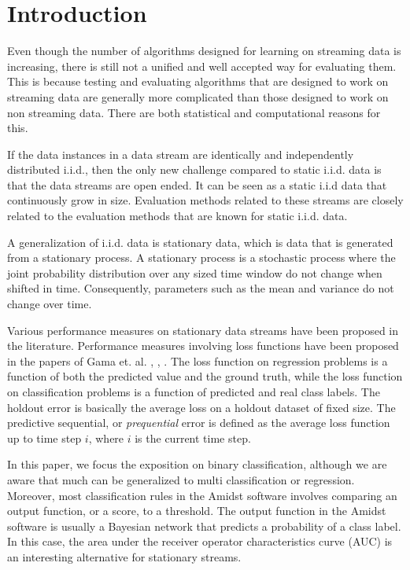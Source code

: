 \section{Introduction}

Even though the number of algorithms designed for learning on streaming data is increasing, there is still not a unified and well accepted way for evaluating them.  This is because testing and evaluating algorithms that are designed to work on streaming data are generally more complicated than those designed to work on non streaming data.  There are both statistical and computational reasons for this.  

If the data instances in a data stream are identically and independently distributed i.i.d., then the only new challenge compared to static i.i.d. data is that the data streams are open ended.  It can be seen as a static i.i.d data that continuously grow in size.  Evaluation methods related to these streams are closely related to the evaluation methods that are known for static i.i.d. data.  

A generalization of i.i.d. data is stationary data, which is data that is generated from a stationary process. A stationary process is a stochastic process where the joint probability distribution over any sized time window do not change when shifted in time.  Consequently, parameters such as the mean and variance do not change over time.

Various performance measures on stationary data streams have been proposed in the literature.  Performance measures involving loss functions have been proposed in the papers of Gama et. al. \cite{Gam09}, \cite{Gam09_2}, \cite{Gam13}.  The loss function on regression problems is a function of both the predicted value and the ground truth, while the loss function on classification problems is a function of predicted and real class labels.  The holdout error is basically the average loss on a holdout dataset of fixed size.  The predictive sequential, or \emph{prequential} error is defined as the average loss function up to time step $i$, where $i$ is the current time step. 

In this paper, we focus the exposition on binary classification, although we are aware that much can be generalized to multi classification or regression.  Moreover, most classification rules in the Amidst software involves comparing an output function, or a score, to a threshold.  The output function in the Amidst software is usually a Bayesian network that predicts a probability of a class label.  In this case, the area
under the receiver operator characteristics curve (AUC) is an interesting alternative for stationary streams.

